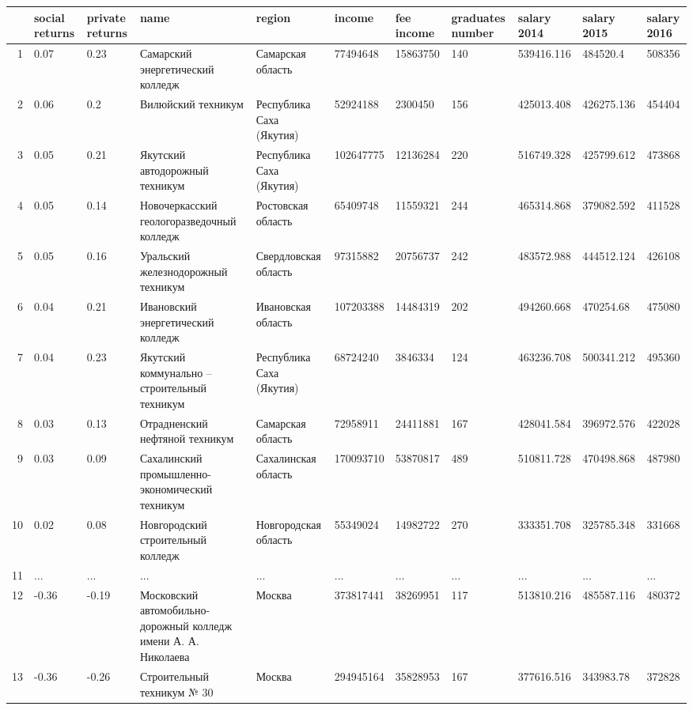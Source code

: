 \documentclass[alpha-refs]{wiley-article-05g}
\begin{document}
\begin{table}[ht]
	\centering
	\begin{tabular}{rllllllllll}
		\hline
		& social returns & private returns & name & region & income & fee income & graduates number & salary 2014 & salary 2015 & salary 2016 \\ 
		\hline
		1 & 0.07 & 0.23 & Самарский энергетический колледж & Самарская область & 77494648 & 15863750 & 140 & 539416.116 & 484520.4 & 508356 \\ 
		2 & 0.06 & 0.2 & Вилюйский техникум & Республика Саха (Якутия) & 52924188 & 2300450 & 156 & 425013.408 & 426275.136 & 454404 \\ 
		3 & 0.05 & 0.21 & Якутский автодорожный техникум & Республика Саха (Якутия) & 102647775 & 12136284 & 220 & 516749.328 & 425799.612 & 473868 \\ 
		4 & 0.05 & 0.14 & Новочеркасский геологоразведочный колледж & Ростовская область & 65409748 & 11559321 & 244 & 465314.868 & 379082.592 & 411528 \\ 
		5 & 0.05 & 0.16 & Уральский железнодорожный техникум & Свердловская область & 97315882 & 20756737 & 242 & 483572.988 & 444512.124 & 426108 \\ 
		6 & 0.04 & 0.21 & Ивановский энергетический колледж & Ивановская область & 107203388 & 14484319 & 202 & 494260.668 & 470254.68 & 475080 \\ 
		7 & 0.04 & 0.23 & Якутский коммунально – строительный техникум & Республика Саха (Якутия) & 68724240 & 3846334 & 124 & 463236.708 & 500341.212 & 495360 \\ 
		8 & 0.03 & 0.13 & Отрадненский нефтяной техникум & Самарская область & 72958911 & 24411881 & 167 & 428041.584 & 396972.576 & 422028 \\ 
		9 & 0.03 & 0.09 & Сахалинский промышленно-экономический техникум & Сахалинская область & 170093710 & 53870817 & 489 & 510811.728 & 470498.868 & 487980 \\ 
		10 & 0.02 & 0.08 & Новгородский строительный колледж & Новгородская область & 55349024 & 14982722 & 270 & 333351.708 & 325785.348 & 331668 \\ 
		11 & ... & ... & ... & ... & ... & ... & ... & ... & ... & ... \\ 
		12 & -0.36 & -0.19 & Московский автомобильно-дорожный колледж имени А. А. Николаева & Москва & 373817441 & 38269951 & 117 & 513810.216 & 485587.116 & 480372 \\ 
		13 & -0.36 & -0.26 & Строительный техникум № 30 & Москва & 294945164 & 35828953 & 167 & 377616.516 & 343983.78 & 372828 \\ 

\end{tabular}
\end{table}
\end{document}
